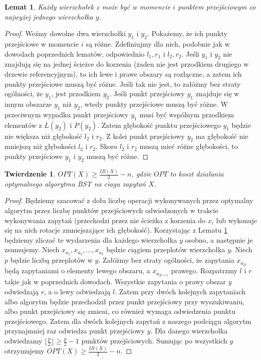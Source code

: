 \documentclass[declaration,shortabstract]{iithesis}
\newcounter{thm}[section]
\theoremstyle{thm}
\theoremstyle{remark}
\theoremstyle{plain}
\newtheorem{theorem}[thm]{Twierdzenie}
\theoremstyle{plain}
\theoremstyle{plain}
\newtheorem{lemma}[thm]{Lemat}
\begin{document}
\begin{lemma} 
\label{eig_trans_point} 
Każdy wierzchołek $z$ może być w momencie $i$ punktem przejściowym co najwyżej jednego wierzchołka $y$. 
\end{lemma} 
\begin{proof} 
Weźmy dowolne dwa wierzchołki $y_1$ i $y_2$. Pokażemy, że ich punkty przejściowe w momencie $i$ są różne. Zdefiniujmy dla nich, podobnie jak w dowodach poprzednich lematów, odpowiednio $l_1, r_1$ i $l_2, r_2$. Jeśli $y_1$ i $y_2$ nie znajdują się na jednej ścieżce do korzenia (żaden nie jest przodkiem drugiego w drzewie referencyjnym), to ich lewe i prawe obszary są rozłączne, a zatem ich punkty przejściowe muszą być różne. Jeśli tak nie jest, to załóżmy bez straty ogólności, że $y_1$, jest przodkiem $y_2$. Jeśli punkt przejściowy $y_1$ znajduje się w innym obszarze $y_1$ niż $y_2$, wtedy punkty przejściowe muszą być różne. W przeciwnym wypadku punkt przejściowy $y_1$ musi być wspólnym przodkiem elementów z $L(y_2)$ i $P(y_2)$. Zatem głębokość punktu przejściowego $y_1$ będzie nie większa niż głębokość $l_2$ i $r_2$. Z kolei punkt przejściowy $y_2$ ma głębokość nie mniejszą niż głębokości $l_2$ i $r_2$. Skoro $l_2$ i $r_2$ muszą mieć różne głębokości, to punkty przejściowe $y_1$ i $y_2$ muszą być różne.  
\end{proof} 
\begin{theorem} 
\label{low_bound} 
\(OPT(X) \geq \frac{IB(X)}{2} - n\), gdzie $OPT$ to koszt działania optymalnego algorytmu BST na ciagu zapytań $X$. 
\end{theorem} 
\begin{proof} 
Będziemy szacować z dołu liczbę operacji wykonywanych przez optymalny algorytm przez liczbę punktów przejściowych odwiedzonych w trakcie wykonywania zapytań (przechodzi przez nie ścieżka z korzenia do $x_i$ lub wykonuje się na nich rotacje zmniejszające ich głębokość). Korzystając z Lematu \ref{eig_trans_point} będziemy zliczać te wydarzenia dla każdego wierzchołka $y$ osobno, a następnie je zsumujemy. Niech \( x_{a_1}, x_{a_2}, ..., x_{a_k}\) będzie ciągiem przeplotów wierzchołka $y$. Niech $p$ będzie liczbą przeplotów w $y$. Załóżmy bez straty ogólności, że zapytania \(x_{a_{2i}}\) będą zapytaniami o elementy lewego obszaru, a \(x_{a_{2i+1}}\) prawego. Rozpatrzmy $l$ i $r$ takie jak w poprzednich dowodach. Wszystkie zapytania o prawy obszar $y$ odwiedzają $r$, a o lewy odwiedzają $l$. Zatem przy dwóch kolejnych zapytaniach albo algorytm będzie przechodził przez punkt przejściowy przy wyszukiwaniu, albo punkt przejściowy się zmieni, co również wymaga odwiedzenia punktu przejściowego. Zatem dla dwóch kolejnych zapytań z naszego podciągu algorytm przynajmniej raz odwiedza punkt przejściowy $y$. Dla danego wierzchołka odwiedzamy \(\lfloor \frac{p}{2} \rfloor \geq \frac{p}{2} -1\) punktów przejściowych. Sumując po wszystkich $y$ otrzymujemy \(OPT(X) \geq \frac{IB(X)}{2} - n\). 
\end{proof}  
\end{document}
